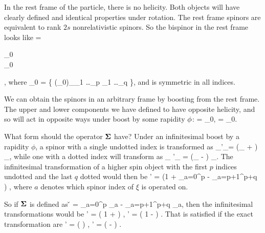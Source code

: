 In the rest frame of the particle, there is no helicity.  Both objects will have clearly defined and identical properties under rotation.    The rest frame spinors are equivalent to rank $2s$ nonrelativistic spinors.  So the bispinor in the rest frame looks like
\beq \label{eq:PsiRest}
	\Psig =  \begin{pmatrix} \xi_0 \\ \xi_0 \end{pmatrix},
\eeq
where
\beq \label{eq:xi0def}
	\xi_0 = \{ (\xi_0)_{\alpha_1 \ldots \alpha_p \beta_1 \ldots \beta_q}  \},
\eeq
and is symmetric in all indices.

We can obtain the spinors in an arbitrary frame by boosting from the rest frame.  The upper and lower components we have defined to have opposite helicity, and so will act in opposite ways under boost by some rapidity $\phi$:
\beq \label{eq:xi0boosted}
	\xi =  \xi_0,  
	\hspace{3em} 
	\eta =  \xi_0.
\eeq

What form should the operator $\mathbf{\Sigma}$ have?  Under an infinitesimal boost by a rapidity $\phi$, a spinor with a single undotted index is transformed as
\beqB
	\xi_\alpha \to \xi'_\alpha = \left(\delta_{\alpha \beta} +  \right) \xi_\beta, 
\eeqB
while one with a dotted index will transform as
\beqB
\xi_{\dot\alpha} \to \xi'_{\dot\alpha} = \left(\delta_{\dot \alpha \dot \beta} -  \right) \xi_{\dot \beta}.
\eeqB
The infinitesimal transformation of a higher spin object with the first $p$ indices undotted and the last $q$ dotted would then be
\beqB
	\xi \to \xi' = \left(1 
		+  \sum\limits_{a=0}^p 
		- \sum\limits_{a=p+1}^{p+q} 
	\right ) \xi,
\eeqB
where $a$ denotes which spinor index of $\xi$ is operated on.


So if $\mbox{\boldmath$ \Sigma $}$ is defined as
\beq \label{eq:SigDef}
	\v{\Sigma} = \sum\limits_{a=0}^p \gv{\sigma}_a - \sum\limits_{a=p+1}^{p+q} \gv{\sigma}_a,
\eeq
then the infinitesimal transformations would be
\beqB
	\xi \to \xi' = \left( 1 +  \right) \xi,
\eeqB
\beqB
	\eta \to \eta' = \left( 1 -  \right) \eta.
\eeqB
That is satisfied if the exact transformation are
\beqB
		\xi \to \xi' = \exp\left(  \right) \xi,
\eeqB
\beqB
	\eta \to \eta' = \exp \left( - \right) \eta.
\eeqB
  
